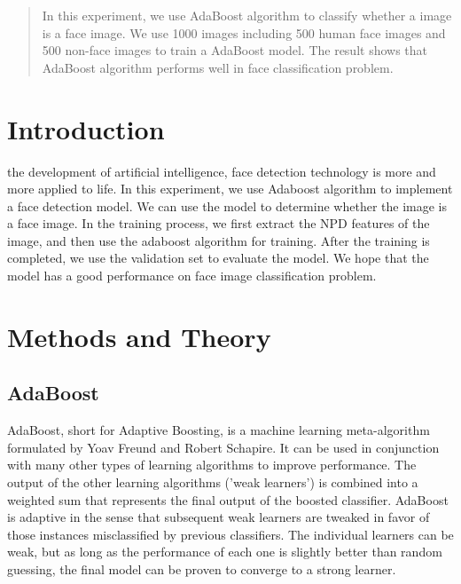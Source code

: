 \documentclass[journal, a4paper]{IEEEtran}
\begin{document}
\begin{abstract}
    In this experiment, we use AdaBoost algorithm to classify whether a image is a face image. We use 1000 images including 500 human face images and 500 non-face images to train a AdaBoost model. The result shows that AdaBoost algorithm performs well in face classification problem. 
\end{abstract}

\section{Introduction}
 the development of artificial intelligence, face detection technology is more and more applied to life. In this experiment, we use Adaboost algorithm to implement a face detection model. We can use the model to determine whether the image is a face image. In the training process, we first extract the NPD features of the image, and then use the adaboost algorithm for training. After the training is completed, we use the validation set to evaluate the model. We hope that the model has a good performance on face image classification problem.
\section{Methods and Theory}

\subsection{AdaBoost}
    AdaBoost, short for Adaptive Boosting, is a machine learning meta-algorithm formulated by Yoav Freund and Robert Schapire. It can be used in conjunction with many other types of learning algorithms to improve performance. The output of the other learning algorithms ('weak learners') is combined into a weighted sum that represents the final output of the boosted classifier. AdaBoost is adaptive in the sense that subsequent weak learners are tweaked in favor of those instances misclassified by previous classifiers. The individual learners can be weak, but as long as the performance of each one is slightly better than random guessing, the final model can be proven to converge to a strong learner.
\end{document}
